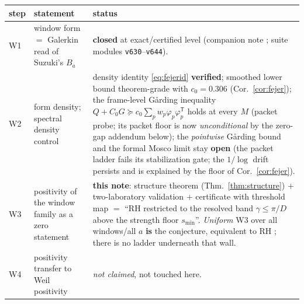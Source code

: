 \documentclass[11pt,a4paper]{article}
\theoremstyle{remark}
\begin{document}
\begin{center}
\small
\begin{tabular}{@{}p{}p{}p{}@{}}
\toprule
step & statement & status\\
\midrule
W1 & window form $=$ Galerkin read of Suzuki's $B_a$ &
\textbf{closed} at exact/certified level (companion note \cite{HamW1};
suite modules \texttt{v630}--\texttt{v644}).\\
W2 & form density; spectral density control & density identity
\eqref{eq:fejerid} \textbf{verified}; smoothed lower bound
theorem-grade with $c_0=0.306$ (Cor.~\ref{cor:fejer}); the frame-level
G\r{a}rding inequality $Q+C_0G\succeq c_0\sum_pw_p\varphi_p
\varphi_p^{\mathsf T}$ holds at every $M$ (packet probe; its packet
floor is now \emph{unconditional} by the zero-gap addendum below); the
\emph{pointwise} G\r{a}rding bound and the formal Mosco limit stay
\textbf{open} (the packet ladder fails its stabilization gate; the
$1/\log$ drift persists and is explained by the floor of
Cor.~\ref{cor:fejer}).\\
W3 & positivity of the window family as a zero statement &
\textbf{this note}: structure theorem (Thm.~\ref{thm:structure})
$+$ two-laboratory validation $+$ certificate with threshold map
$=$ ``RH restricted to the resolved band $\gamma\le\pi/D$ above the
strength floor $s_{\min}$''.  \emph{Uniform} W3 over all windows/all
$a$ \textbf{is} the conjecture, equivalent to RH
\cite{Weil52,Yoshida92,BL99}; there is no ladder underneath that
wall.\\
W4 & positivity transfer to Weil positivity & \emph{not claimed}, not
touched here.\\
\bottomrule
\end{tabular}
\end{center}
\end{document}
